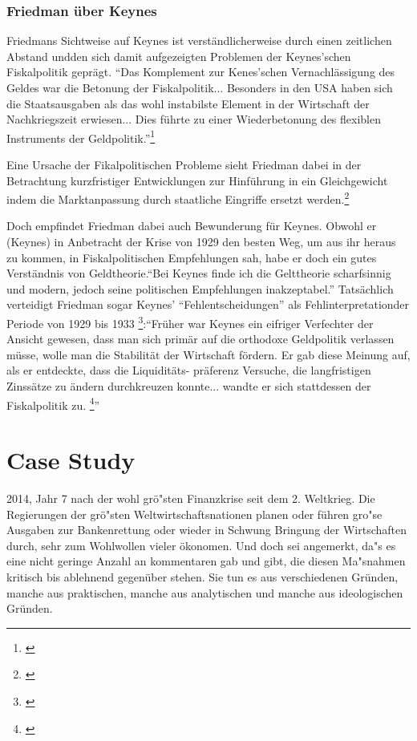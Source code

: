 \documentclass[
        onecolumn,
        a4paper,
        abstracton,
        parskip=half
        ,final
        ]{scrartcl}
\begin{document}
\subsubsection{Friedman {\"u}ber Keynes} %
Friedmans Sichtweise auf Keynes ist verst{\"a}ndlicherweise durch einen zeitlichen Abstand undden sich damit aufgezeigten Problemen der Keynes'schen Fiskalpolitik gepr{\"a}gt.  "`Das Komplement zur Kenes'schen Vernachl{\"a}ssigung des Geldes war die Betonung der
Fiskalpolitik... Besonders in den USA haben sich die Staatsausgaben als das wohl instabilste Element in der Wirtschaft der Nachkriegszeit erwiesen... Dies f{\"u}hrte zu einer Wiederbetonung des flexiblen Instruments der Geldpolitik."'\footnote[801]{\citep[S.105]{friedman1970die}}


 Eine Ursache der Fikalpolitischen Probleme sieht Friedman dabei in der Betrachtung kurzfristiger Entwicklungen zur Hinf{\"u}hrung in ein Gleichgewicht indem die Marktanpassung durch staatliche Eingriffe ersetzt werden.\footnote[802]{\citep[S.127]{friedman1970die}}

Doch empfindet Friedman dabei auch Bewunderung f{\"u}r Keynes. Obwohl er (Keynes) in Anbetracht der Krise von 1929 den besten Weg,
um aus ihr heraus zu kommen, in Fiskalpolitischen Empfehlungen sah, habe er doch ein gutes
Verst{\"a}ndnis von Geldtheorie."`Bei Keynes finde ich die Gelttheorie scharfsinnig und
modern, jedoch seine politischen Empfehlungen inakzeptabel."' Tats{\"a}chlich verteidigt
Friedman sogar Keynes'  "`Fehlentscheidungen"' als Fehlinterpretationder Periode von 1929
bis 1933 \footnote[803]{\citep[S.121]{friedman1970die}}:"`Fr{\"u}her war Keynes ein eifriger Verfechter der Ansicht gewesen, dass man sich
prim{\"a}r auf die orthodoxe Geldpolitik verlassen m{\"u}sse, wolle man die Stabilit{\"a}t der
Wirtschaft f{\"o}rdern. Er gab diese Meinung auf, als er entdeckte, dass die Liquidit{\"a}ts-
pr{\"a}ferenz Versuche, die langfristigen Zinss{\"a}tze zu {\"a}ndern durchkreuzen konnte... wandte er
sich stattdessen der Fiskalpolitik zu. \footnote[804]{\citep[S.126]{friedman1970die}}"'



\clearpage
\section{Case Study} %
\label{sec4:CaseStudy}
2014, Jahr 7 nach der wohl gr{\"o}{"s}ten Finanzkrise seit dem 2. Weltkrieg. Die Regierungen der gr{\"o}{"s}ten Weltwirtschaftsnationen planen oder f{\"u}hren gro{"s}e Ausgaben zur Bankenrettung oder wieder in Schwung Bringung der Wirtschaften durch, sehr zum Wohlwollen vieler {\"o}konomen. Und doch sei angemerkt, da{"s} es eine nicht geringe Anzahl an kommentaren gab und gibt, die diesen Ma{"s}nahmen kritisch bis ablehnend gegen{\"u}ber stehen. Sie tun es aus verschiedenen Gr{\"u}nden, manche aus praktischen, manche aus analytischen und manche aus ideologischen Gr{\"u}nden.
\end{document}
